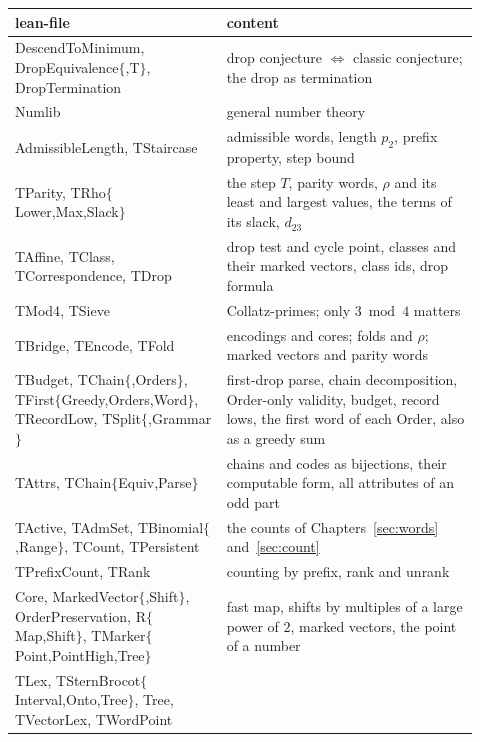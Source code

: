 \documentclass[11pt,a4paper,titlepage]{article}
\newcommand{\lean}[1]{\textsf{#1}}
\begin{document}
\begin{table}[p]
\centering
\footnotesize
\begin{tabular}{@{}>{\raggedright\arraybackslash}p{0.42\linewidth}>{\raggedright\arraybackslash}p{0.5\linewidth}@{}}
\toprule
lean-file & content \\
\midrule
\lean{DescendToMinimum}, \lean{DropEquivalence$\{$,T$\}$}, \lean{DropTermination}
  & drop conjecture $\iff$ classic conjecture; the drop as termination \\
\lean{Numlib}
  & general number theory \\
\lean{AdmissibleLength}, \lean{TStaircase}
  & admissible words, length $p_2$, prefix property, step bound \\
\lean{TParity}, \lean{TRho$\{$Lower,Max,Slack$\}$}
  & the step $T$, parity words, $\rho$ and its least and largest values, the terms of its slack, $d_{23}$ \\
\lean{TAffine}, \lean{TClass}, \lean{TCorrespondence}, \lean{TDrop}
  & drop test and cycle point, classes and their marked vectors, class ids, drop formula \\
\lean{TMod4}, \lean{TSieve}
  & Collatz-primes; only $3 \bmod 4$ matters \\
\lean{TBridge}, \lean{TEncode}, \lean{TFold}
  & encodings and cores; folds and $\rho$; marked vectors and parity words \\
\lean{TBudget}, \lean{TChain$\{$,Orders$\}$}, \lean{TFirst$\{$Greedy,Orders,Word$\}$}, \lean{TRecordLow}, \lean{TSplit$\{$,Grammar$\}$}
  & first-drop parse, chain decomposition, Order-only validity, budget, record lows, the first word of each Order, also as a greedy sum \\
\lean{TAttrs}, \lean{TChain$\{$Equiv,Parse$\}$}
  & chains and codes as bijections, their computable form, all attributes of an odd part \\
\lean{TActive}, \lean{TAdmSet}, \lean{TBinomial$\{$,Range$\}$}, \lean{TCount}, \lean{TPersistent}
  & the counts of Chapters~\ref{sec:words} and~\ref{sec:count} \\
\lean{TPrefixCount}, \lean{TRank}
  & counting by prefix, rank and unrank \\
\lean{Core}, \lean{MarkedVector$\{$,Shift$\}$}, \lean{OrderPreservation}, \lean{R$\{$Map,Shift$\}$}, \lean{TMarker$\{$Point,PointHigh,Tree$\}$}
  & fast map, shifts by multiples of a large power of $2$, marked vectors, the point of a number \\
\lean{TLex}, \lean{TSternBrocot$\{$Interval,Onto,Tree$\}$}, \lean{Tree}, \lean{TVectorLex}, \lean{TWordPoint}

\end{tabular}
\end{table}
\end{document}
